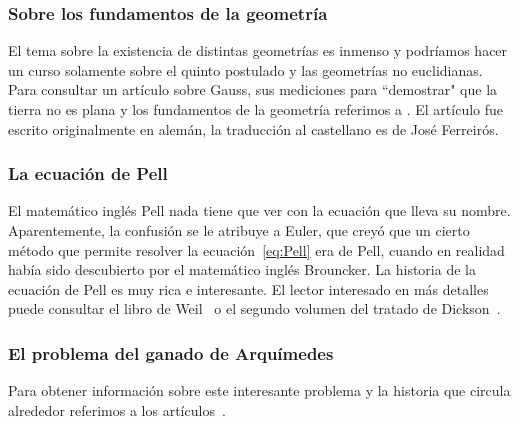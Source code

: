 \subsubsection*{Sobre los fundamentos de la geometría}

El tema sobre la existencia de distintas geometrías es inmenso y podríamos
hacer un curso solamente sobre el quinto postulado y las geometrías no euclidianas. 
Para consultar un 
artículo sobre Gauss, sus mediciones para ``demostrar" que la tierra
no es plana y los fundamentos de la geometría
referimos a \cite{scholz_triangulos}. El artículo fue escrito originalmente 
en alemán, la traducción al castellano
es de José Ferreirós.

\subsubsection*{La ecuación de Pell}

El matemático inglés Pell nada tiene que ver con la ecuación que lleva su nombre.
Aparentemente, la confusión se le atribuye a Euler, 
que creyó que un cierto método que permite
resolver la ecuación~\eqref{eq:Pell} era de Pell, 
cuando en realidad había sido descubierto
por el matemático inglés Brouncker.  La historia de la ecuación de Pell es muy
rica e interesante. El lector interesado en más detalles puede consultar el
libro de Weil~\cite{MR734177} o el segundo volumen del tratado de
Dickson~\cite{MR0245500}.

\subsubsection*{El problema del ganado de Arquímedes}

Para obtener información sobre este interesante problema y la historia
que circula alrededor referimos a
los artículos~\cite{MR1513794,MR1875156,MR1238181,MR1614879,MR1344311}.
